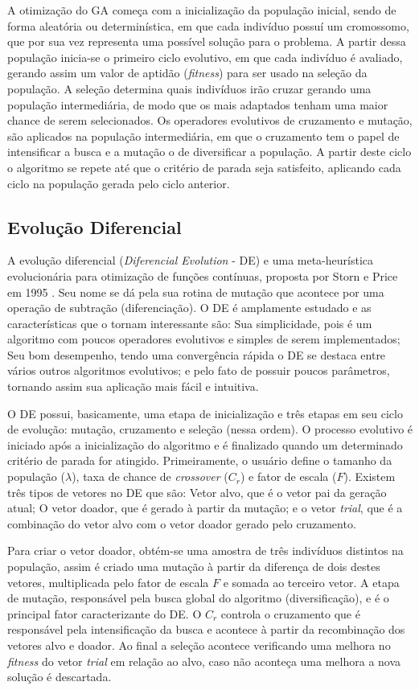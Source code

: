 A otimização do GA começa com a inicialização da população inicial, sendo de forma aleatória ou determinística, em que cada indivíduo possuí um cromossomo, que por sua vez representa uma possível solução para o problema. A partir dessa população inicia-se o primeiro ciclo evolutivo, em que cada indivíduo é avaliado, gerando assim um valor de aptidão (\textit{fitness}) para ser usado na seleção da população. A seleção determina quais indivíduos irão cruzar gerando uma população intermediária, de modo que os mais adaptados tenham uma maior chance de serem selecionados. Os operadores evolutivos de cruzamento e mutação, são aplicados na população intermediária, em que o cruzamento tem o papel de intensificar a busca e a mutação o de diversificar a população. A partir deste ciclo o algoritmo se repete até que o critério de parada seja satisfeito, aplicando cada ciclo na população gerada pelo ciclo anterior.

\subsection{Evolução Diferencial}
\label{sec:diferencial_evolution}
A evolução diferencial (\textit{Diferencial Evolution} - DE) e uma meta-heurística evolucionária para otimização de funções contínuas, proposta por Storn e Price em 1995 \cite{de}. Seu nome se dá pela sua rotina de mutação que acontece por uma operação de subtração (diferenciação). O DE é amplamente estudado e as características que o tornam interessante são: Sua simplicidade, pois é um algoritmo com poucos operadores evolutivos e simples de serem implementados; Seu bom desempenho, tendo uma convergência rápida o DE se destaca entre vários outros algoritmos evolutivos; e pelo fato de possuir poucos parâmetros, tornando assim sua aplicação mais fácil e intuitiva.

O DE possui, basicamente, uma etapa de inicialização e três etapas em seu ciclo de evolução: mutação, cruzamento e seleção (nessa ordem). O processo evolutivo é iniciado após a inicialização do algoritmo e é finalizado quando um determinado critério de parada for atingido. Primeiramente, o usuário define o tamanho da população ($\lambda$), taxa de chance de \textit{crossover} ($C_r$) e fator de escala ($F$). Existem três tipos de vetores no DE que são: Vetor alvo, que é o vetor pai da geração atual; O vetor doador, que é gerado à partir da mutação; e o vetor \textit{trial}, que é a combinação do vetor alvo com o vetor doador gerado pelo cruzamento. 

Para criar o vetor doador, obtém-se uma amostra de três indivíduos distintos na população, assim é criado uma mutação à partir da diferença de dois destes vetores, multiplicada pelo fator de escala $F$ e somada ao terceiro vetor. A etapa de mutação, responsável pela busca global do algoritmo (diversificação), e é o principal fator caracterizante do DE. O $C_r$ controla o cruzamento que é responsável pela intensificação da busca e acontece à partir da recombinação dos vetores alvo e doador. Ao final a seleção acontece verificando uma melhora no \textit{fitness} do vetor \textit{trial} em relação ao alvo, caso não aconteça uma melhora a nova solução é descartada.

